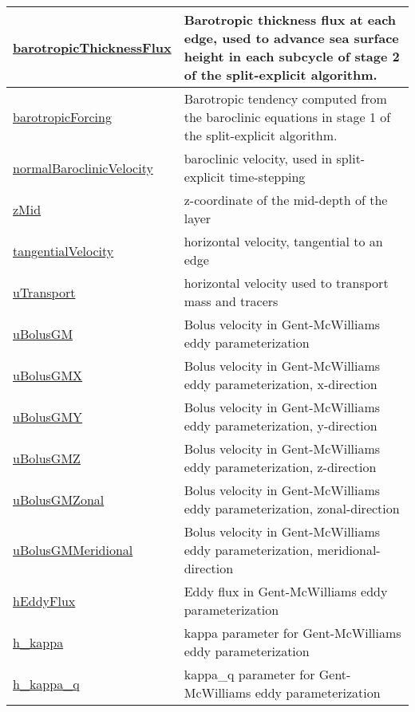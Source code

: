 {\begin{center}
\begin{longtable}{| p{2.0in} | p{4.0in} |}
	\hline
	\hyperref[subsec:var_sec_state_barotropicThicknessFlux]{barotropicThicknessFlux} & Barotropic thickness flux at each edge, used to advance sea surface height in each subcycle of stage 2 of the split-explicit algorithm. \\
	\hline
	\hyperref[subsec:var_sec_state_barotropicForcing]{barotropicForcing} & Barotropic tendency computed from the baroclinic equations in stage 1 of the split-explicit algorithm. \\
	\hline
	\hyperref[subsec:var_sec_state_normalBaroclinicVelocity]{normalBaroclinicVelocity} & baroclinic velocity, used in split-explicit time-stepping \\
	\hline
	\hyperref[subsec:var_sec_state_zMid]{zMid} & z-coordinate of the mid-depth of the layer \\
	\hline
	\hyperref[subsec:var_sec_state_tangentialVelocity]{tangentialVelocity} & horizontal velocity, tangential to an edge \\
	\hline
	\hyperref[subsec:var_sec_state_uTransport]{uTransport} & horizontal velocity used to transport mass and tracers \\
	\hline
	\hyperref[subsec:var_sec_state_uBolusGM]{uBolusGM} & Bolus velocity in Gent-McWilliams eddy parameterization \\
	\hline
	\hyperref[subsec:var_sec_state_uBolusGMX]{uBolusGMX} & Bolus velocity in Gent-McWilliams eddy parameterization, x-direction \\
	\hline
	\hyperref[subsec:var_sec_state_uBolusGMY]{uBolusGMY} & Bolus velocity in Gent-McWilliams eddy parameterization, y-direction \\
	\hline
	\hyperref[subsec:var_sec_state_uBolusGMZ]{uBolusGMZ} & Bolus velocity in Gent-McWilliams eddy parameterization, z-direction \\
	\hline
	\hyperref[subsec:var_sec_state_uBolusGMZonal]{uBolusGMZonal} & Bolus velocity in Gent-McWilliams eddy parameterization, zonal-direction \\
	\hline
	\hyperref[subsec:var_sec_state_uBolusGMMeridional]{uBolusGMMeridional} & Bolus velocity in Gent-McWilliams eddy parameterization, meridional-direction \\
	\hline
	\hyperref[subsec:var_sec_state_hEddyFlux]{hEddyFlux} & Eddy flux in Gent-McWilliams eddy parameterization \\
	\hline
	\hyperref[subsec:var_sec_state_h_kappa]{h\_kappa} & kappa parameter for Gent-McWilliams eddy parameterization \\
	\hline
	\hyperref[subsec:var_sec_state_h_kappa_q]{h\_kappa\_q} & kappa\_q parameter for Gent-McWilliams eddy parameterization \\

\end{longtable}
\end{center}}
